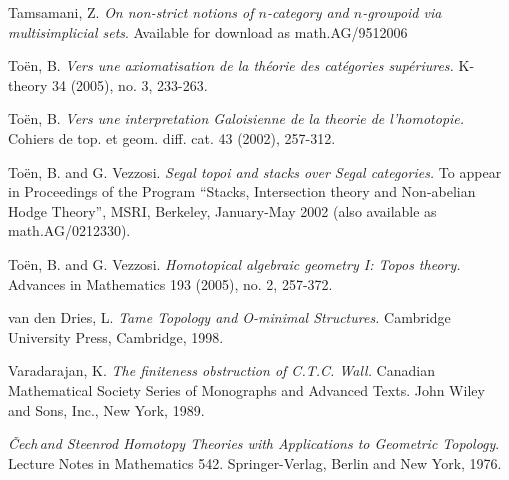 \documentclass[12pt, final]{report}
\newcommand{\Cech}{\v{C}ech\,}
\theoremstyle{definition}
\begin{document}
\begin{thebibliography}{99}
 Tamsamani, Z. {\it On non-strict notions
of $n$-category and $n$-groupoid via multisimplicial sets}. Available for download as
math.AG/9512006

 To\"{e}n, B. {\it Vers une axiomatisation de la th\'{e}orie des cat\'{e}gories sup\'{e}riures.} K-theory 34 (2005), no. 3, 233-263.

 To\"{e}n, B. {\it Vers une interpretation Galoisienne de la theorie de l'homotopie.} Cohiers de top. et geom. diff. cat. 43 (2002), 257-312.

 To\"{e}n, B. and G. Vezzosi.
{\it Segal topoi and stacks over Segal categories.} To appear in Proceedings of the Program ``Stacks, Intersection theory and Non-abelian Hodge Theory'', MSRI, Berkeley, January-May 2002 (also available as math.AG/0212330). 

 To\"{e}n, B. and G. Vezzosi. {\it Homotopical algebraic geometry I: Topos theory.} Advances in Mathematics 193 (2005), no. 2, 257-372.

 van den Dries, L. {\it Tame Topology and O-minimal
Structures.} Cambridge University Press, Cambridge, 1998.

 Varadarajan, K. {\it The finiteness obstruction of C.T.C. Wall.}
Canadian Mathematical Society Series of Monographs and Advanced Texts. John Wiley and Sons, Inc., New York, 1989.

 {\it \Cech and Steenrod Homotopy Theories
with Applications to Geometric Topology}. Lecture Notes in
Mathematics 542. Springer-Verlag, Berlin and New York, 1976.
\end{thebibliography}

\end{document}
